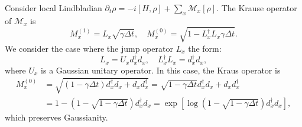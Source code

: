 \documentclass{SciPost}
\begin{document}
Consider local Lindbladian $\partial_t \rho = -i[H,\rho] + \sum_x \mathcal{M}_x[\rho]$.
The Krause operator of $\mathcal M_x$ is
\begin{equation}
	M_x^{(1)} = L_x \sqrt{\gamma \Delta t},\quad
	M_x^{(0)} = \sqrt{1-L_x^\dagger L_x \gamma \Delta t}.
\end{equation}
We consider the case where the jump operator $L_x$ the form:
\begin{equation}
	L_x = U_x d_x^\dagger d_x,\quad
	L_x^\dagger L_x = d_x^\dagger d_x,
\end{equation}
where $U_x$ is a Gaussian unitary operator. In this case, the Kraus operator is 
\begin{equation*}
\begin{aligned}
	M_x^{(0)} &= \sqrt{(1-\gamma\Delta t)d_x^\dagger d_x + d_x d_x^\dagger} 
	= \sqrt{1-\gamma\Delta t} d_x^\dagger d_x + d_x d_x^\dagger \\
	&= 1 - \left(1-\sqrt{1-\gamma\Delta t}\right) d_x^\dagger d_x
	= \exp\left[\log\left(1-\sqrt{1-\gamma\Delta t}\right) d_x^\dagger d_x\right],
\end{aligned}
\end{equation*}
which preserves Gaussianity. 
\end{document}
